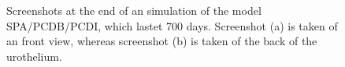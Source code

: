 \begin{figure}[ht]
\begin{center}
\end{center}
\begin{center}
\end{center}
\caption[Simulated urothel with the model SPA/PCDB/PCDI at day 700]{Screenshots at the end of an simulation of the model SPA/PCDB/PCDI, which lastet 700 days. Screenshot (a) is taken of an front view, whereas screenshot (b) is taken of the back of the urothelium.}
\label{img:720daysScreenshotSPA/BCPD/IPCD}
\end{figure}



